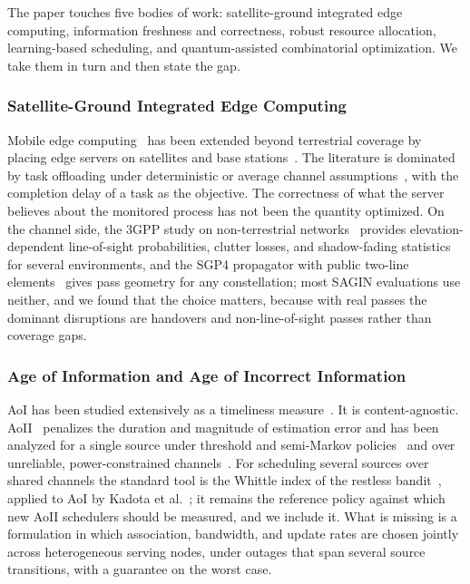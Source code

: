 The paper touches five bodies of work: satellite-ground integrated edge computing, information freshness and
correctness, robust resource allocation, learning-based scheduling, and quantum-assisted combinatorial optimization.
We take them in turn and then state the gap.

\subsubsection{Satellite-Ground Integrated Edge Computing}
Mobile edge computing~\cite{Mao2017} has been extended beyond terrestrial coverage by placing edge servers on
satellites and base stations~\cite{Liu2018, Kato2019, Zhang2019}. The literature is dominated by task offloading
under deterministic or average channel assumptions~\cite{Cheng2019, Zhou2021}, with the completion delay of a task as
the objective. The correctness of what the server believes about the monitored process has not been the quantity
optimized. On the channel side, the 3GPP study on non-terrestrial networks~\cite{TR38811} provides
elevation-dependent line-of-sight probabilities, clutter losses, and shadow-fading statistics for several
environments, and the SGP4 propagator with public two-line elements~\cite{Vallado2006} gives pass geometry for any
constellation; most SAGIN evaluations use neither, and we found that the choice matters, because with real passes the
dominant disruptions are handovers and non-line-of-sight passes rather than coverage gaps.

\subsubsection{Age of Information and Age of Incorrect Information}
AoI has been studied extensively as a timeliness measure~\cite{Kaul2012, Kosta2017, Sun2017, Kadota2018, Yates2021}.
It is content-agnostic. AoII~\cite{Maatouk2020} penalizes the duration and magnitude of estimation error and has been
analyzed for a single source under threshold and semi-Markov policies~\cite{Maatouk2023, Kriouile2021} and over
unreliable, power-constrained channels~\cite{Chen2021}. For scheduling several sources over shared channels the
standard tool is the Whittle index of the restless bandit~\cite{Whittle1988}, applied to AoI by Kadota et
al.~\cite{Kadota2018}; it remains the reference policy against which new AoII schedulers should be measured, and we
include it. What is missing is a formulation in which association, bandwidth, and update rates are chosen jointly
across heterogeneous serving nodes, under outages that span several source transitions, with a guarantee on the
worst case.

